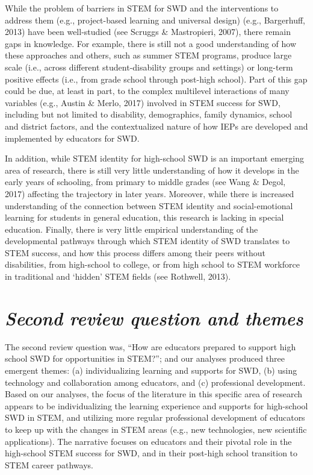 \documentclass[11pt]{sig-alternate}
\begin{document}
\begin{large}
While the problem of barriers in STEM for SWD and the interventions to address them (e.g., project-based learning and universal design) (e.g., Bargerhuff, 2013) have been well-studied (see Scruggs \& Mastropieri, 2007), there remain gaps in knowledge. For example, there is still not a good understanding of how these approaches and others, such as summer STEM programs, produce large scale (i.e., across different student-disability groups and settings) or long-term positive effects (i.e., from grade school through post-high school). Part of this gap could be due, at least in part, to the complex multilevel interactions of many variables (e.g., Austin \& Merlo, 2017) involved in STEM success for SWD, including but not limited to disability, demographics, family dynamics, school and district factors, and the contextualized nature of how IEPs are developed and implemented by educators for SWD. 

In addition, while STEM identity for high-school SWD is an important emerging area of research, there is still very little understanding of how it develops in the early years of schooling, from primary to middle grades (see Wang \& Degol, 2017) affecting the trajectory in later years. Moreover, while there is increased understanding of the connection between STEM identity and social-emotional learning for students in general education, this research is lacking in special education. Finally, there is very little empirical understanding of the developmental pathways through which STEM identity of SWD translates to STEM success, and how this process differs among their peers without disabilities, from high-school to college, or from high school to STEM workforce in traditional and ‘hidden’ STEM fields (see Rothwell, 2013).  
    

\section*{\textit{Second review question and themes}}
The second review question was, “How are educators prepared to support high school SWD for opportunities in STEM?”; and our analyses produced three emergent themes: (a) individualizing learning and supports for SWD, (b) using technology and collaboration among  educators, and (c) professional development. Based on our analyses, the focus of the literature in this specific area of research appears to be individualizing the learning experience and supports for high-school SWD in STEM, and utilizing more regular professional development of educators to keep up with the changes in STEM areas (e.g., new technologies, new scientific applications). The narrative focuses on educators and their pivotal role in the high-school STEM success for SWD, and in their post-high school transition to STEM career pathways.


\end{large}
\end{document}
